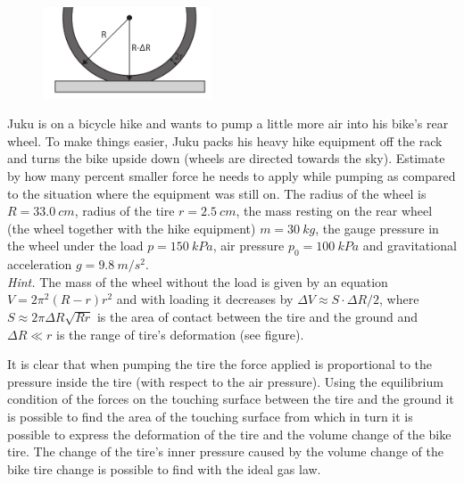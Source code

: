 {\ifEngStatement
\begin{figure}
	\vspace{-15pt}
	\includegraphics[width=5cm]{2017-lahg-05-fig_rattakumm}
\end{figure}
Juku is on a bicycle hike and wants to pump a little more air into his bike’s rear wheel. To make things easier, Juku packs his heavy hike equipment off the rack and turns the bike upside down (wheels are directed towards the sky). Estimate by how many percent smaller force he needs to apply while pumping as compared to the situation where the equipment was still on. The radius of the wheel is $R=\SI{33.0}{cm}$, radius of the tire $r=\SI{2.5}{cm}$, the mass resting on the rear wheel (the wheel together with the hike equipment) $m=\SI{30}{kg}$, the gauge pressure in the wheel under the load $p=\SI{150}{kPa}$, air pressure $p_{0}=\SI{100}{kPa}$ and gravitational acceleration $g=\SI{9.8}{m/s^{2}}$.\\
\emph{Hint.} The mass of the wheel without the load is given by an equation $V=2\pi^{2}\left(R-r\right)r^{2}$ and with loading it decreases by $\Delta V\approx S\cdot\Delta R/2$, where $S\approx2\pi\Delta R\sqrt{Rr}$ is the area of contact between the tire and the ground and $\Delta R\ll r$ is the range of tire’s deformation (see figure).
\fi


\ifEngHint
It is clear that when pumping the tire the force applied is proportional to the pressure inside the tire (with respect to the air pressure). Using the equilibrium condition of the forces on the touching surface between the tire and the ground it is possible to find the area of the touching surface from which in turn it is possible to express the deformation of the tire and the volume change of the bike tire. The change of the tire's inner pressure caused by the volume change of the bike tire change is possible to find with the ideal gas law.
\fi


}
